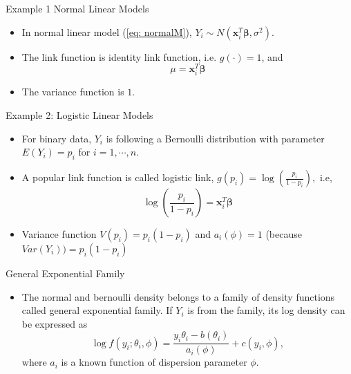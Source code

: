 \documentclass{beamer}
\begin{document}
     
         \begin{frame}{Example 1 Normal Linear Models}
         \begin{itemize}
         \item In normal linear model (\ref{eq: normalM}), $Y_{i} \sim N(\mathbf{x}^{T}_{i}\boldsymbol{\beta}, \sigma^{2})$.
        \item The link function is identity link function, i.e. $g(\cdot) = 1$, and
        $$\mu = \mathbf{x}^{T}_{i}\boldsymbol{\beta}$$
        \item The variance function is $1$.
        \end{itemize}
        \end{frame}
        
        
        \begin{frame}{Example 2: Logistic Linear Models}
        \begin{itemize}
         \item For binary data, $Y_{i}$ is following a Bernoulli distribution with parameter $E(Y_{i}) = p_{i}$ for $i = 1, \cdots, n$.
        \item A popular link function is called logistic link, $g(p_{i}) = \log\left(\frac{p_{i}}{1-p_{i}}\right),$ i.e, 
        $$\log\left(\frac{p_{i}}{1-p_{i}}\right) = \mathbf{x}^{T}_{i}\boldsymbol{\beta}$$
        \item Variance function $V(p_{i}) = p_{i}(1-p_{i})$ and $a_{i}(\phi) = 1$ (because $Var(Y_{i})) = p_{i}(1-p_{i})$
        \end{itemize}
        \end{frame}
        
        
        \begin{frame}{General Exponential Family}
        \begin{itemize}
         \item The normal and bernoulli density belongs to a family of density functions called general exponential family. If $Y_{i}$ is from the family, its log density can be expressed as
         \begin{equation}
                \log f(y_{i};\theta_{i}, \phi) = \frac{y_{i}\theta_{i}-b(\theta_{i})}{a_{i}(\phi)} + c(y_{i}, \phi), \label{eq: LikeexpoF}
        \end{equation}
        where $a_{i}$ is a known function of dispersion parameter $\phi$.
        \end{itemize}
        \end{frame}
        
\end{document}
